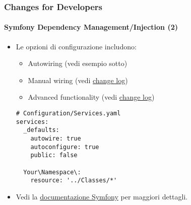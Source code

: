 \begin{frame}[fragile]
	\frametitle{Changes for Developers}
	\framesubtitle{Symfony Dependency Management/Injection (2)}

	\lstset{basicstyle=\tiny\ttfamily}

	\begin{itemize}
		\item Le opzioni di configurazione includono:

			\begin{itemize}
				\item Autowiring (vedi esempio sotto)
				\item Manual wiring
					(vedi \href{https://docs.typo3.org/c/typo3/cms-core/master/en-us/Changelog/10.0/Feature-84112-SymfonyDependencyInjectionForCoreAndExtbase.html}{change log})
				\item Advanced functionality
					(vedi \href{https://docs.typo3.org/c/typo3/cms-core/master/en-us/Changelog/10.0/Feature-84112-SymfonyDependencyInjectionForCoreAndExtbase.html}{change log})
			\end{itemize}


\begin{lstlisting}
# Configuration/Services.yaml
services:
  _defaults:
    autowire: true
    autoconfigure: true
    public: false

  Your\Namespace\:
    resource: '../Classes/*'
\end{lstlisting}

		\item Vedi la \href{https://symfony.com/doc/current/service_container.html}{documentazione Symfony} per maggiori dettagli.

	\end{itemize}

\end{frame}


